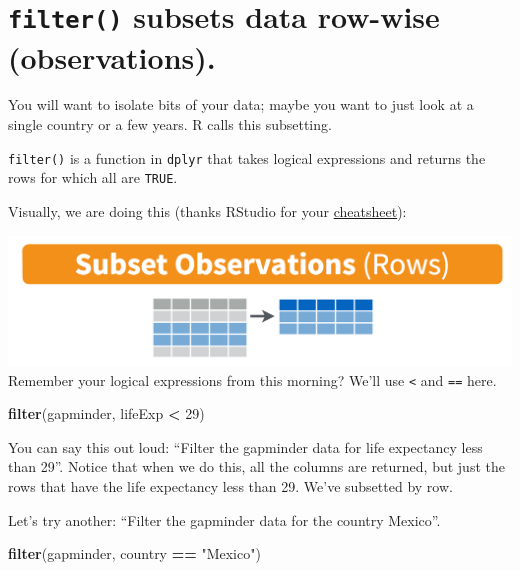 \documentclass[]{book}
\newenvironment{Shaded}{\begin{snugshade}}{\end{snugshade}}
\newcommand{\KeywordTok}[1]{\textcolor[rgb]{0.13,0.29,0.53}{\textbf{#1}}}
\newcommand{\DecValTok}[1]{\textcolor[rgb]{0.00,0.00,0.81}{#1}}
\newcommand{\StringTok}[1]{\textcolor[rgb]{0.31,0.60,0.02}{#1}}
\newcommand{\OperatorTok}[1]{\textcolor[rgb]{0.81,0.36,0.00}{\textbf{#1}}}
\newcommand{\NormalTok}[1]{#1}
\theoremstyle{definition}
\theoremstyle{definition}
\theoremstyle{definition}
\theoremstyle{remark}
\begin{document}
\section{\texorpdfstring{\texttt{filter()} subsets data row-wise
(observations).}{filter() subsets data row-wise (observations).}}\label{filter-subsets-data-row-wise-observations.}

You will want to isolate bits of your data; maybe you want to just look
at a single country or a few years. R calls this subsetting.

\texttt{filter()} is a function in \texttt{dplyr} that takes logical
expressions and returns the rows for which all are \texttt{TRUE}.

Visually, we are doing this (thanks RStudio for your
\href{http://www.rstudio.com/wp-content/uploads/2015/02/data-wrangling-cheatsheet.pdf}{cheatsheet}):

\includegraphics{img/rstudio-cheatsheet-filter.png} Remember your
logical expressions from this morning? We'll use \texttt{\textless{}}
and \texttt{==} here.

\begin{Shaded}
\begin{Highlighting}[]
\KeywordTok{filter}\NormalTok{(gapminder, lifeExp }\OperatorTok{<}\StringTok{ }\DecValTok{29}\NormalTok{)}
\end{Highlighting}
\end{Shaded}

You can say this out loud: ``Filter the gapminder data for life
expectancy less than 29''. Notice that when we do this, all the columns
are returned, but just the rows that have the life expectancy less than
29. We've subsetted by row.

Let's try another: ``Filter the gapminder data for the country Mexico''.

\begin{Shaded}
\begin{Highlighting}[]
\KeywordTok{filter}\NormalTok{(gapminder, country }\OperatorTok{==}\StringTok{ "Mexico"}\NormalTok{)}
\end{Highlighting}
\end{Shaded}
\end{document}
